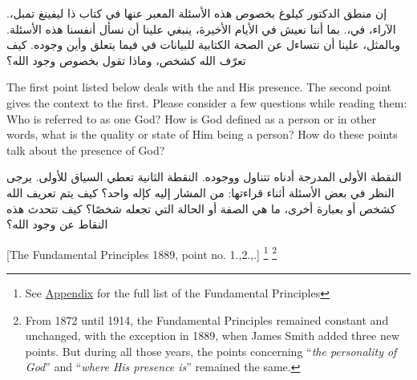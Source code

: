 إن منطق الدكتور كيلوغ بخصوص هذه الأسئلة المعبر عنها في كتاب ذا ليفينغ تمبل،. الآراء، في،. بما أننا نعيش في الأيام الأخيرة، ينبغي علينا أن نسأل أنفسنا هذه الأسئلة. وبالمثل، علينا أن نتساءل عن الصحة الكتابية للبيانات في  فيما يتعلق  وأين وجوده. كيف تعرّف  الله كشخص، وماذا تقول بخصوص وجود الله؟


The first point listed below deals with the  and His presence. The second point gives the context to the first. Please consider a few questions while reading them: Who is referred to as one God? How is God defined as a person or in other words, what is the quality or state of Him being a person? How do these points talk about the presence of God?


النقطة الأولى المدرجة أدناه تتناول  ووجوده. النقطة الثانية تعطي السياق للأولى. يرجى النظر في بعض الأسئلة أثناء قراءتها: من المشار إليه كإله واحد؟ كيف يتم تعريف الله كشخص أو بعبارة أخرى، ما هي الصفة أو الحالة التي تجعله شخصًا؟ كيف تتحدث هذه النقاط عن وجود الله؟






[The Fundamental Principles 1889, point no. 1.,2.,.] \footnote{See \hyperref[chap:appendix]{Appendix} for the full list of the Fundamental Principles} \footnote{From 1872 until 1914, the Fundamental Principles remained constant and unchanged, with the exception in 1889, when James Smith added three new points. But during all those years, the points concerning “\textit{the personality of God}” and “\textit{where His presence is}” remained the same. }



